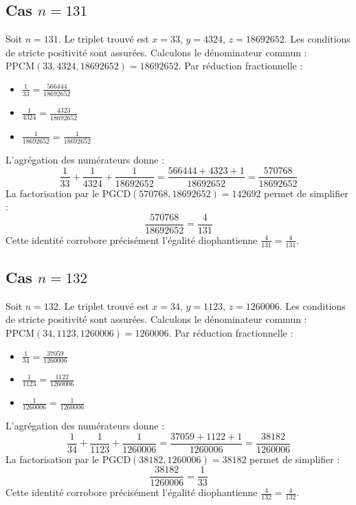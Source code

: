 \documentclass[11pt,a4paper]{article}
\begin{document}
\subsection{Cas $n = 131$}
Soit $n = 131$. Le triplet trouvé est $x = 33$, $y = 4324$, $z = 18692652$.
Les conditions de stricte positivité sont assurées.
Calculons le dénominateur commun : $\text{PPCM}(33, 4324, 18692652) = 18692652$.
Par réduction fractionnelle :
\begin{itemize}
    \item $\frac{1}{33} = \frac{566444}{18692652}$
    \item $\frac{1}{4324} = \frac{4323}{18692652}$
    \item $\frac{1}{18692652} = \frac{1}{18692652}$
\end{itemize}
L'agrégation des numérateurs donne :
$$ \frac{1}{33} + \frac{1}{4324} + \frac{1}{18692652} = \frac{566444 + 4323 + 1}{18692652} = \frac{570768}{18692652} $$
La factorisation par le $\text{PGCD}(570768, 18692652) = 142692$ permet de simplifier :
$$ \frac{570768}{18692652} = \frac{4}{131} $$
Cette identité corrobore précisément l'égalité diophantienne $\frac{4}{131} = \frac{4}{131}$.

\subsection{Cas $n = 132$}
Soit $n = 132$. Le triplet trouvé est $x = 34$, $y = 1123$, $z = 1260006$.
Les conditions de stricte positivité sont assurées.
Calculons le dénominateur commun : $\text{PPCM}(34, 1123, 1260006) = 1260006$.
Par réduction fractionnelle :
\begin{itemize}
    \item $\frac{1}{34} = \frac{37059}{1260006}$
    \item $\frac{1}{1123} = \frac{1122}{1260006}$
    \item $\frac{1}{1260006} = \frac{1}{1260006}$
\end{itemize}
L'agrégation des numérateurs donne :
$$ \frac{1}{34} + \frac{1}{1123} + \frac{1}{1260006} = \frac{37059 + 1122 + 1}{1260006} = \frac{38182}{1260006} $$
La factorisation par le $\text{PGCD}(38182, 1260006) = 38182$ permet de simplifier :
$$ \frac{38182}{1260006} = \frac{1}{33} $$
Cette identité corrobore précisément l'égalité diophantienne $\frac{4}{132} = \frac{4}{132}$.
\end{document}
